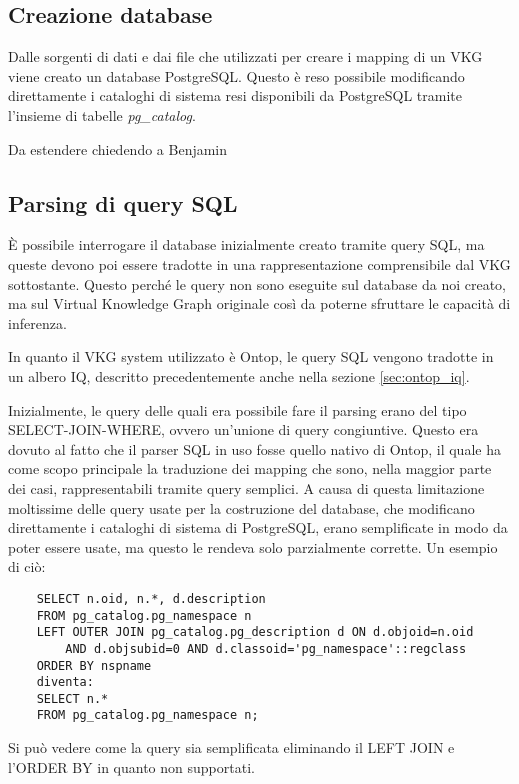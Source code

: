 \subsection{Creazione database}
\label{sec:bi-connector_db}
Dalle sorgenti di dati e dai file che utilizzati per creare i mapping di un VKG viene creato un database PostgreSQL.
Questo è reso possibile modificando direttamente i cataloghi di sistema resi disponibili da PostgreSQL tramite l'insieme di tabelle \textit{pg\_catalog}.

Da estendere chiedendo a Benjamin

\subsection{Parsing di query SQL}
\label{sec:bi-connector_parsing}
\`E possibile interrogare il database inizialmente creato tramite query SQL, ma queste devono poi essere tradotte in una rappresentazione comprensibile dal VKG sottostante. Questo perché le query non sono eseguite sul database da noi creato, ma sul
Virtual Knowledge Graph originale così da poterne sfruttare le capacità di inferenza.

In quanto il VKG system utilizzato è Ontop, le query SQL vengono tradotte in un albero IQ, descritto precedentemente anche nella sezione \ref{sec:ontop_iq}. 

Inizialmente, le query delle quali era possibile fare il parsing erano del tipo SELECT-JOIN-WHERE, ovvero un'unione di query congiuntive. Questo era dovuto al fatto che il parser SQL in uso fosse quello nativo di Ontop,
il quale ha come scopo principale la traduzione dei mapping che sono, nella maggior parte dei casi, rappresentabili tramite query semplici.
A causa di questa limitazione moltissime delle query usate per la costruzione del database, che modificano direttamente i cataloghi di sistema di PostgreSQL, erano semplificate in modo da poter essere usate, ma questo le rendeva solo parzialmente
corrette. Un esempio di ciò:
\begin{lstlisting}
    SELECT n.oid, n.*, d.description 
    FROM pg_catalog.pg_namespace n
    LEFT OUTER JOIN pg_catalog.pg_description d ON d.objoid=n.oid 
        AND d.objsubid=0 AND d.classoid='pg_namespace'::regclass
    ORDER BY nspname
    diventa:
    SELECT n.* 
    FROM pg_catalog.pg_namespace n;
\end{lstlisting}
Si può vedere come la query sia semplificata eliminando il LEFT JOIN e l'ORDER BY in quanto non supportati.


